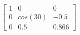 \documentclass[preview]{standalone}
\begin{document}
\begin{align*}
\left[ \begin{array}{ccc}1 & 0 & 0 \\ 0 & cos(30) & -0.5 \\ 0 & 0.5 & 0.866\end{array} \right]
\end{align*}
\end{document}
